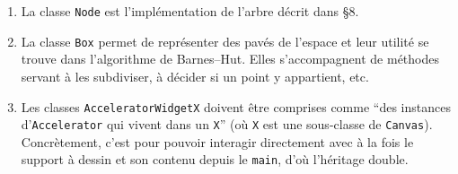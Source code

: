 \documentclass[12pt, letterpaper, twoside]{article}
\newcommand{\T}[1]{\texttt{#1}}
\begin{document}
\begin{enumerate}
	\item La classe \T{Node} est l'implémentation de l'arbre décrit dans \S 8.

	\item La classe \T{Box} permet de représenter des pavés de l'espace et leur utilité se trouve dans l'algorithme de Barnes--Hut. Elles s'accompagnent de méthodes servant à les subdiviser, à décider si un point y appartient, etc.

	\item Les classes \T{AcceleratorWidgetX} doivent être comprises comme ``des instances d'\T{Accelerator} qui vivent dans un \T{X}'' (où \T{X} est une sous-classe de \T{Canvas}). Concrètement, c'est pour pouvoir interagir directement avec à la fois le support à dessin et son contenu depuis le \T{main}, d'où l'héritage double.
\end{enumerate}
\end{document}
